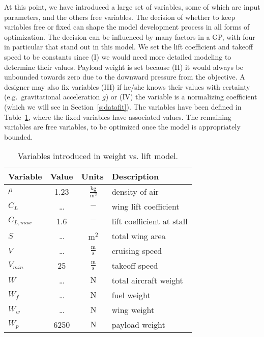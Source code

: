 At this point, we have introduced a large set of variables, some of which are input
parameters, and the others free variables. The decision of whether to keep variables free or fixed
can shape the model development process in all forms of optimization.
The decision can be influenced by many
factors in a \gls{GP}, with four in particular that stand out in this model.
We set the lift coefficient and takeoff speed
to be constants since (I) we would need
more detailed modeling to determine their values. Payload weight is set
because (II) it would always be unbounded towards zero due to the downward pressure from
the objective. A designer may also fix variables (III) if he/she knows their values with
certainty (e.g.\ gravitational acceleration $g$) or (IV) the variable is a normalizing
coefficient (which we will see in Section~\ref{s:datafit}).
The variables have been defined in Table~\ref{t:vars_WandL}, where the fixed variables
have associated values.
The remaining variables are free variables, to be optimized once the model
is appropriately bounded.

\begin{footnotesize}
\begin{table}
    \centering
    \begin{tabular}{ l c c l}
        \toprule
        \textbf{Variable} & \textbf{Value} & \textbf{Units} & \textbf{Description} \\
        \midrule
        $\rho$ & 1.23 & $~\mathrm{\tfrac{kg}{m^{3}}}$ & density of air \\
        $C_L$ & \ldots & $~\mathrm{-}$ & wing lift coefficient \\
        $C_{L,max}$ & 1.6 & $~\mathrm{-}$ & lift coefficient at stall \\
        $S$ & \ldots & $~\mathrm{m^{2}}$ & total wing area \\
        $V$ & \ldots & $~\mathrm{\tfrac{m}{s}}$ & cruising speed \\
        $V_{min}$ & 25 & $~\mathrm{\tfrac{m}{s}}$ & takeoff speed \\
        $W$ & \ldots & $~\mathrm{N}$ & total aircraft weight \\
        $W_f$ & \ldots & $~\mathrm{N}$ & fuel weight \\
        $W_w$ & \ldots & $~\mathrm{N}$ & wing weight \\
        $W_p$ & 6250 & $~\mathrm{N}$ & payload weight \\
        \bottomrule
    \end{tabular}
    \caption{Variables introduced in weight vs. lift model.}
    \label{t:vars_WandL}
\end{table} \end{footnotesize}

